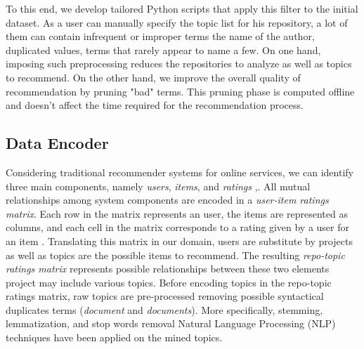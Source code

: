 To this end, we develop tailored Python scripts that apply this filter to the initial dataset. As a \GH user can manually specify the topic list for his repository, a lot of them can contain infrequent or improper terms \ie the name of the author, duplicated values, terms that rarely appear to name a few. On one hand, imposing such preprocessing reduces the repositories to analyze as well as topics to recommend. On the other hand, we improve the overall quality of recommendation by pruning "bad" terms. 
This pruning phase is computed offline and doesn't affect the time required for the recommendation process. 



\subsection{Data Encoder} \label{sec:DataEncoder}

Considering traditional recommender systems for online services, we can identify three main components, namely \emph{users}, \emph{items}, and
\emph{ratings} \cite{Sarwar:2001:ICF:371920.372071},\cite{DBLP:conf/rweb/NoiaO15}. All mutual relationships among system components are encoded in a \emph{user-item ratings matrix}. 
Each row in the matrix represents an user, the items are represented as columns, and each cell in the matrix corresponds to a rating given by a user for an item
\cite{DBLP:conf/rweb/NoiaO15}. Translating this matrix in our domain, users are substitute by projects as well as topics are the possible items to recommend. The resulting \emph{repo-topic ratings matrix} represents possible relationships between these two elements \ie project may include various topics. 
Before encoding topics in the repo-topic ratings matrix, raw topics are pre-processed removing possible syntactical duplicates terms (\eg \textit{document} and \textit{documents}). More specifically, stemming, lemmatization, and stop words removal Natural Language Processing (NLP) techniques have been applied on the mined topics.



